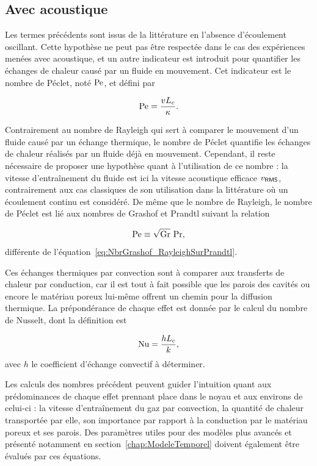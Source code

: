 \subsection{Avec acoustique}
Les termes précédents sont issus de la littérature en l'absence d'écoulement oscillant. Cette hypothèse ne peut pas être respectée dans le cas des expériences menées avec acoustique, et un autre indicateur est introduit pour quantifier les échanges de chaleur causé par un fluide en mouvement. Cet indicateur est le nombre de Péclet, noté $\mathrm{Pe}$, et défini par

\begin{equation}
	\mathrm{Pe} = \frac{v L_c}{\kappa}.
	\label{eq:NbrPeclet}
\end{equation}

Contrairement au nombre de Rayleigh qui sert à comparer le mouvement d'un fluide causé par un échange thermique, le nombre de Péclet quantifie les échanges de chaleur réalisés par un fluide déjà en mouvement. Cependant, il reste nécessaire de proposer une hypothèse quant à l'utilisation de ce nombre : la vitesse d'entraînement du fluide est ici la vitesse acoustique efficace $v_{\sf RMS}$, contrairement aux cas classiques de son utilisation dans la littérature où un écoulement continu est considéré. De même que le nombre de Rayleigh, le nombre de Péclet est lié aux nombres de Grashof et Prandtl suivant la relation 

\begin{equation}
	\mathrm{Pe} \equiv \sqrt{\mathrm{Gr}}~\mathrm{Pr},
	\label{eq:NbrPeclet_GrashofFoisPrandtl}
\end{equation}
différente de l'équation~\eqref{eq:NbrGrashof_RayleighSurPrandtl}.\medskip

Ces échanges thermiques par convection sont à comparer aux transferts de chaleur par conduction, car il est tout à fait possible que les parois des cavités ou encore le matériau poreux lui-même offrent un chemin pour la diffusion thermique. La prépondérance de chaque effet est donnée par le calcul du nombre de Nusselt, dont la définition est

\begin{equation}
	\mathrm{Nu} = \frac{h L_c}{k},
\end{equation}
avec $h$ le coefficient d'échange convectif à déterminer.\bigskip

Les calculs des nombres précédent peuvent guider l'intuition quant aux prédominances de chaque effet prennant place dans le noyau et aux environs de celui-ci : la vitesse d'entraînement du gaz par convection, la quantité de chaleur transportée par elle, son importance par rapport à la conduction par le matériau poreux et ses parois. Des paramètres utiles pour des modèles plus avancés et présenté notamment en section~\ref{chap:ModeleTemporel} doivent également être évalués par ces équations.

